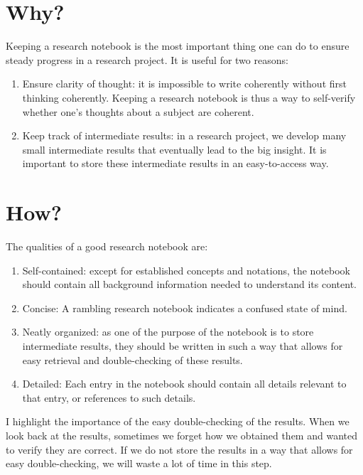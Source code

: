 \documentclass[11pt]{article}
\begin{document}
\section{Why?}

Keeping a research notebook is the most important thing one can do to ensure steady progress in a research project. It is useful for two reasons:

\begin{enumerate}
	\item Ensure clarity of thought: it is impossible to write coherently without first thinking coherently. Keeping a research notebook is thus a way to self-verify whether one's thoughts about a subject are coherent.
	\item Keep track of intermediate results: in a research project, we develop many small intermediate results that eventually lead to the big insight. It is important to store these intermediate results in an easy-to-access way.
\end{enumerate}

\section{How?}

The qualities of a good research notebook are:

\begin{enumerate}
	\item Self-contained: except for established concepts and notations, the notebook should contain all background information needed to understand its content.
	\item Concise: A rambling research notebook indicates a confused state of mind.
	\item Neatly organized: as one of the purpose of the notebook is to store intermediate results, they should be written in such a way that allows for easy retrieval and double-checking of these results.
	\item Detailed: Each entry in the notebook should contain all details relevant to that entry, or references to such details. 
\end{enumerate}

I highlight the importance of the easy double-checking of the results. When we look back at the results, sometimes we forget how we obtained them and wanted to verify they are correct. If we do not store the results in a way that allows for easy double-checking, we will waste a lot of time in this step.
\\
\end{document}
